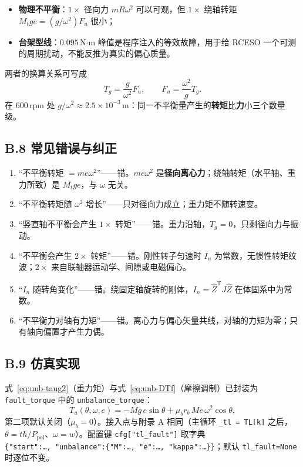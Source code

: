 \documentclass[11pt,a4paper]{article}
\theoremstyle{remark}\newtheorem{remark}{注}
\begin{document}
\begin{itemize}
  \item \textbf{物理不平衡}：$1\times$ 径向力 $mR\omega^2$ 可以可观，但 $1\times$ 绕轴转矩 $M_tge=(g/\omega^2)F_u$ 很小；
  \item \textbf{台架型线}：$0.095$\,N$\cdot$m 峰值是程序注入的等效故障，用于给 RCESO 一个可测的周期扰动，不能反推为真实的偏心质量。
\end{itemize}

两者的换算关系可写成
\begin{equation}
T_g=\frac{g}{\omega^2}F_u,\qquad
F_u=\frac{\omega^2}{g}T_g .
\label{eq:unb-conv}
\end{equation}
在 $600$\,rpm 处 $g/\omega^2\approx2.5\times10^{-3}$\,m：同一不平衡量产生的\textbf{转矩}比\textbf{力}小三个数量级。

\subsection*{B.8 常见错误与纠正}

\begin{enumerate}
  \item “不平衡转矩 $=m e\omega^2$”——错。$m e\omega^2$ 是\textbf{径向离心力}；绕轴转矩（水平轴、重力所致）是 $M_t g e$，与 $\omega$ 无关。
  \item “不平衡转矩随 $\omega^2$ 增长”——只对径向力成立；重力矩不随转速变。
  \item “竖直轴不平衡会产生 $1\times$ 转矩”——错。重力沿轴，$T_g=0$，只剩径向力与振动。
  \item “不平衡会产生 $2\times$ 转矩”——错。刚性转子匀速时 $I_n$ 为常数，无惯性转矩纹波；$2\times$ 来自联轴器运动学、间隙或电磁偏心。
  \item “$I_n$ 随转角变化”——错。绕固定轴旋转的刚体，$I_n=\hat Z^{\mathrm T}J\hat Z$ 在体固系中为常数。
  \item “不平衡力对轴有力矩”——错。离心力与偏心矢量共线，对轴的力矩为零；只有轴向偏置才产生力偶。
\end{enumerate}

\subsection*{B.9 仿真实现}

式~\eqref{eq:unb-taug2}（重力矩）与式~\eqref{eq:unb-DTf}（摩擦调制）已封装为 \texttt{fault\_torque} 中的 \texttt{unbalance\_torque}：
\begin{equation}
T_u(\theta,\omega,e)=-M g\,e\sin\theta+\mu_b r_b\,M e\,\omega^2\cos\theta ,
\label{eq:unb-impl}
\end{equation}
第二项默认关闭（$\mu_b=0$）。接入点与附录 A 相同（主循环 \texttt{\_tl = TL[k]} 之后，$\theta=th/P_{\mathrm{pol}}$、$\omega=w$）。配置键 \texttt{cfg["tl\_fault"]} 取字典 \texttt{\{"start":\ldots,\ "unbalance":\{"M":\ldots,\ "e":\ldots,\ "kappa":\ldots\}\}}；默认 \texttt{tl\_fault=None} 时逐位不变。
\end{document}
